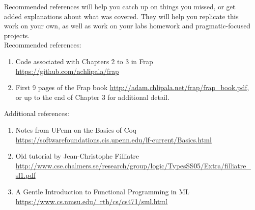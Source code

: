 \documentclass{article}
\begin{document}
Recommended references will help you catch up on things you missed, or get added explanations about what was covered. They will help you replicate this work on your own, as well as work on your labs homework and pragmatic-focused projects. \\

Recommended references:
\begin{enumerate}
    \item Code associated with Chapters 2 to 3 in Frap \href{https://github.com/achlipala/frap}{https://github.com/achlipala/frap}
    \item First 9 pages of the Frap book \href{http://adam.chlipala.net/frap/frap\_book.pdf}{http://adam.chlipala.net/frap/frap\_book.pdf}, or up to the end of Chapter 3 for additional detail.
\end{enumerate}

Additional references:
\begin{enumerate}
    \item Notes from UPenn on the Basics of Coq \href{https://softwarefoundations.cis.upenn.edu/lf-current/Basics.html}{https://softwarefoundations.cis.upenn.edu/lf-current/Basics.html}
    \item Old tutorial by Jean-Christophe Filliatre\\ \href{http://www.cse.chalmers.se/research/group/logic/TypesSS05/Extra/filliatre\_sl1.pdf}{http://www.cse.chalmers.se/research/group/logic/TypesSS05/Extra/filliatre\_sl1.pdf} 
    \item A Gentle Introduction to Functional Programming in ML \href{https://www.cs.nmsu.edu/~rth/cs/cs471/sml.html}{https://www.cs.nmsu.edu/~rth/cs/cs471/sml.html}
\end{enumerate}
\end{document}
